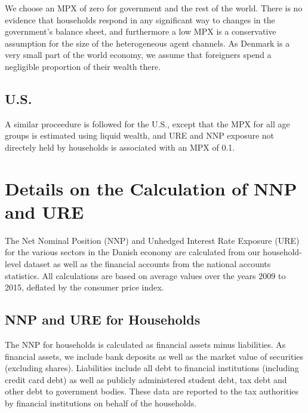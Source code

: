 \documentclass[titlepage]{\econtex}\newcommand{\texname}{ConsumptionHeterogeneity}
\begin{document}
	We choose an MPX of zero for government and the rest of the world. There is no evidence that households respond in any significant way to changes in the government's balance sheet, and furthermore a low MPX is a conservative assumption for the size of the heterogeneous agent channels. As Denmark is a very small part of the world economy, we assume that foreigners spend a negligible proportion of their wealth there.
	
	\subsection{U.S.}
	A similar proceedure is followed for the U.S., except that the MPX for all age groups is estimated using liquid wealth, and URE and NNP exposure not directely held by households is associated with an MPX of 0.1.	
	
	
	\section{Details on the Calculation of NNP and URE}
	\setcounter{figure}{0}   
	\setcounter{table}{0} 
	\label{URE_NNP_appendix}
	The Net Nominal Position (NNP) and Unhedged Interest Rate Exposure (URE) for the various sectors in the Danish economy are calculated from our household-level dataset as well as the financial accounts from the national accounts statistics. All calculations are based on average values over the years 2009 to 2015, deflated by the consumer price index. 
	
	\subsection{NNP and URE for Households}
	The NNP for households is calculated as financial assets minus liabilities. As financial assets, we include bank deposits as well as the market value of securities (excluding shares). Liabilities include all debt to financial institutions (including credit card debt) as well as publicly administered student debt, tax debt and other debt to government bodies. These data are reported to the tax authorities by financial institutions on behalf of the households.
	
\end{document}

